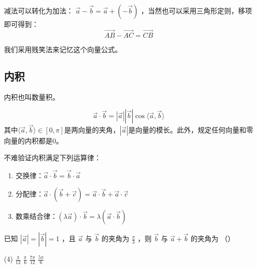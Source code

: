 \begin{definition}[向量的减法]
    减法可以转化为加法：
    $\overrightarrow{a}-\overrightarrow{b} = \overrightarrow{a}+(-\overrightarrow{b})$
    ，当然也可以采用三角形定则，移项即可得到：
    $$
        \overrightarrow{AB} - \overrightarrow{AC} = \overrightarrow{CB}
    $$
    \begin{tips}
        我们采用贱笑法来记忆这个向量公式。
    \end{tips}
\end{definition}

\subsection{内积}
内积也叫数量积。
\begin{definition}[内积]
    $$
        \overrightarrow{a}\cdot \overrightarrow{b} = |\overrightarrow{a}||\overrightarrow{b}|\cos \langle \overrightarrow{a},\overrightarrow{b} \rangle
    $$
    其中$\langle \overrightarrow{a},\overrightarrow{b} \rangle \in [0,\pi]$是两向量的夹角，$|\overrightarrow{a}|$是向量的模长。此外，规定任何向量和零向量的内积都是0。
\end{definition}

\begin{theorem}[内积的运算律]
    不难验证内积满足下列运算律：
    \begin{enumerate}
        \item 交换律：$\overrightarrow{a}\cdot \overrightarrow{b} = \overrightarrow{b} \cdot \overrightarrow{a}$
        \item 分配律：$\overrightarrow{a}\cdot (\overrightarrow{b}+\overrightarrow{c}) = \overrightarrow{a} \cdot \overrightarrow{b} + \overrightarrow{a} \cdot \overrightarrow{c}$
        \item 数乘结合律：$(\lambda \overrightarrow{a})\cdot \overrightarrow{b} = \lambda (\overrightarrow{a} \cdot \overrightarrow{b})$
    \end{enumerate}
\end{theorem}

\begin{example}
    已知 $|\overrightarrow{a}|=|\overrightarrow{b}|=1$ ，且 $\overrightarrow{a}$ 与 $\overrightarrow{b}$ 的夹角为 $\frac{\pi}{3}$ ，则 $\overrightarrow{b}$ 与 $\overrightarrow{a}+\overrightarrow{b}$ 的夹角为 （\qquad）
    \begin{tasks}(4)
        \task $\frac{\pi}{12}$
        \task $\frac{\pi}{6}$
        \task $\frac{7 \pi}{12}$
        \task $\frac{5 \pi}{6}$
    \end{tasks}
\end{example}

